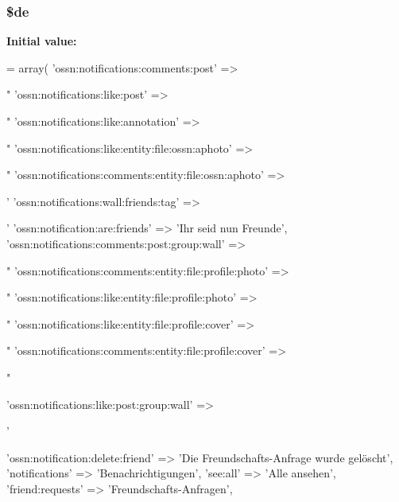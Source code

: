 \subsubsection[{\texorpdfstring{\$de}{$de}}]{\setlength{\rightskip}{0pt plus 5cm}\$de}\hypertarget{components_2_ossn_notifications_2locale_2ossn_8de_8php_aab7de7e51b4580005f63dd4cf5e17311}{}\label{components_2_ossn_notifications_2locale_2ossn_8de_8php_aab7de7e51b4580005f63dd4cf5e17311}
{\bfseries Initial value\+:}
\begin{DoxyCode}
= array(
    \textcolor{stringliteral}{'ossn:notifications:comments:post'} => \textcolor{stringliteral}{"%
    \textcolor{stringliteral}{'ossn:notifications:like:post'} => \textcolor{stringliteral}{"%
    \textcolor{stringliteral}{'ossn:notifications:like:annotation'} => \textcolor{stringliteral}{"%
    \textcolor{stringliteral}{'ossn:notifications:like:entity:file:ossn:aphoto'} => \textcolor{stringliteral}{"%
    \textcolor{stringliteral}{'ossn:notifications:comments:entity:file:ossn:aphoto'} => \textcolor{stringliteral}{'%
    \textcolor{stringliteral}{'ossn:notifications:wall:friends:tag'} => \textcolor{stringliteral}{'%
    \textcolor{stringliteral}{'ossn:notification:are:friends'} => \textcolor{stringliteral}{'Ihr seid nun Freunde'},
    \textcolor{stringliteral}{'ossn:notifications:comments:post:group:wall'} => \textcolor{stringliteral}{"%
    \textcolor{stringliteral}{'ossn:notifications:comments:entity:file:profile:photo'} => \textcolor{stringliteral}{"%
    \textcolor{stringliteral}{'ossn:notifications:like:entity:file:profile:photo'} => \textcolor{stringliteral}{"%
    \textcolor{stringliteral}{'ossn:notifications:like:entity:file:profile:cover'} => \textcolor{stringliteral}{"%
    \textcolor{stringliteral}{'ossn:notifications:comments:entity:file:profile:cover'} => \textcolor{stringliteral}{"%

    \textcolor{stringliteral}{'ossn:notifications:like:post:group:wall'} => \textcolor{stringliteral}{'%
    
    \textcolor{stringliteral}{'ossn:notification:delete:friend'} => \textcolor{stringliteral}{'Die Freundschafts-Anfrage wurde gelöscht'},
    \textcolor{stringliteral}{'notifications'} => \textcolor{stringliteral}{'Benachrichtigungen'},
    \textcolor{stringliteral}{'see:all'} => \textcolor{stringliteral}{'Alle ansehen'},
    \textcolor{stringliteral}{'friend:requests'} => \textcolor{stringliteral}{'Freundschafts-Anfragen'},

}}}}}}}}}}}}
\end{DoxyCode}
